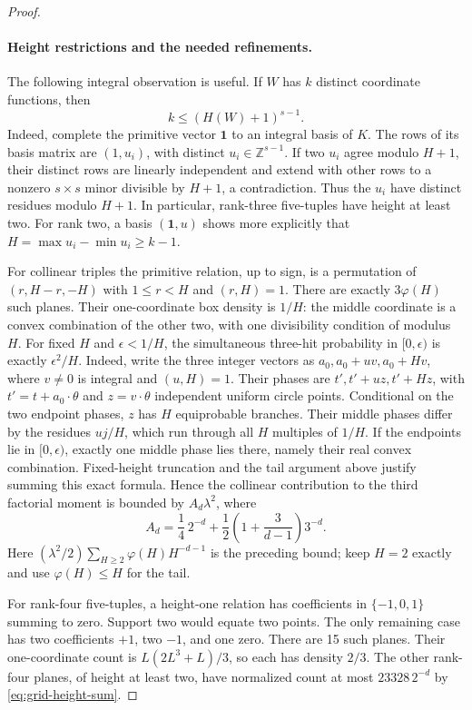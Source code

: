 \documentclass[11pt]{article}
\theoremstyle{definition}
\theoremstyle{remark}
\newcommand{\Z}{\mathbb Z}
\begin{document}
\begin{proof}
\paragraph{Height restrictions and the needed refinements.}
The following integral observation is useful. If $W$ has $k$ distinct
coordinate functions, then
\begin{equation}\label{eq:grid-packing-height}
k\le(H(W)+1)^{s-1}.
\end{equation}
Indeed, complete the primitive vector $\mathbf1$ to an integral basis
of $K$. The rows of its basis matrix are $(1,u_i)$, with distinct
$u_i\in\Z^{s-1}$. If two $u_i$ agree modulo $H+1$, their distinct
rows are linearly independent and extend with other rows to a nonzero
$s\times s$ minor divisible by $H+1$, a contradiction. Thus the $u_i$
have distinct residues modulo $H+1$.
In particular, rank-three five-tuples have height at least two.
For rank two, a basis $(\mathbf1,u)$ shows more explicitly that
$H=\max u_i-\min u_i\ge k-1$.

For collinear triples the primitive relation, up to sign, is a
permutation of $(r,H-r,-H)$ with $1\le r<H$ and $(r,H)=1$.
There are exactly $3\varphi(H)$ such planes. Their one-coordinate box
density is $1/H$: the middle coordinate is a convex combination of
the other two, with one divisibility condition of modulus $H$.
For fixed $H$ and $\epsilon<1/H$, the simultaneous three-hit probability
in $[0,\epsilon)$ is exactly $\epsilon^2/H$.
Indeed, write the three integer vectors as $a_0,a_0+u v,a_0+Hv$,
where $v\ne0$ is integral and $(u,H)=1$. Their phases are
$t',t'+u z,t'+Hz$, with $t'=t+a_0\cdot\theta$ and
$z=v\cdot\theta$ independent uniform circle points. Conditional on
the two endpoint phases, $z$ has $H$ equiprobable branches. Their
middle phases differ by the residues $u j/H$, which run through all
$H$ multiples of $1/H$. If the endpoints lie in $[0,\epsilon)$,
exactly one middle phase lies there, namely their real convex
combination. Fixed-height truncation and the tail argument above
justify summing this exact formula. Hence the collinear contribution
to the third factorial moment is bounded by $A_d\lambda^2$, where
\begin{equation}\label{eq:grid-Ad}
A_d=\frac14\,2^{-d}
+\frac12\left(1+\frac3{d-1}\right)3^{-d}.
\end{equation}
Here $(\lambda^2/2)\sum_{H\ge2}\varphi(H)H^{-d-1}$ is the preceding
bound; keep $H=2$ exactly and use $\varphi(H)\le H$ for the tail.

For rank-four five-tuples, a height-one relation has coefficients in
$\{-1,0,1\}$ summing to zero. Support two would equate two points.
The only remaining case has two coefficients $+1$, two $-1$, and one
zero. There are 15 such planes. Their one-coordinate count is
$L(2L^3+L)/3$, so each has density $2/3$. The other rank-four planes,
of height at least two, have normalized count at most
$23328\,2^{-d}$ by \eqref{eq:grid-height-sum}.


\end{proof}
\end{document}
